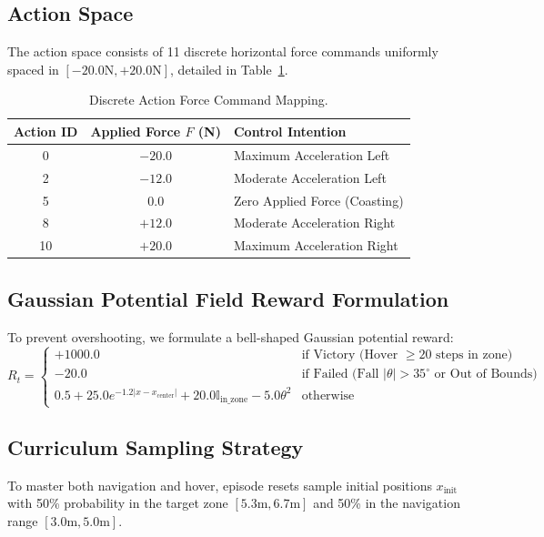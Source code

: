 \documentclass[journal,twocolumn]{IEEEtran}
\begin{document}
\subsection{Action Space}
The action space consists of 11 discrete horizontal force commands uniformly spaced in $[-20.0\text{N}, +20.0\text{N}]$, detailed in Table~\ref{tab:action_space}.

\begin{table}[htbp]
\centering
\caption{Discrete Action Force Command Mapping.}
\label{tab:action_space}
\begin{tabular}{ccl}
\toprule
\textbf{Action ID} & \textbf{Applied Force $F$ (N)} & \textbf{Control Intention} \\ 
\midrule
0 & $-20.0$ & Maximum Acceleration Left \\
2 & $-12.0$ & Moderate Acceleration Left \\
5 & $0.0$    & Zero Applied Force (Coasting) \\
8 & $+12.0$  & Moderate Acceleration Right \\
10 & $+20.0$ & Maximum Acceleration Right \\
\bottomrule
\end{tabular}
\end{table}

\subsection{Gaussian Potential Field Reward Formulation}
To prevent overshooting, we formulate a bell-shaped Gaussian potential reward:
\begin{equation}
R_t = \begin{cases} 
+1000.0 & \text{if Victory (Hover } \ge 20 \text{ steps in zone)} \\
-20.0 & \text{if Failed (Fall } |\theta| > 35^\circ \text{ or Out of Bounds)} \\
0.5 + 25.0 e^{-1.2 |x - x_{\text{center}}|} + 20.0 \mathbb{I}_{\text{in\_zone}} - 5.0 \theta^2 & \text{otherwise}
\end{cases}
\end{equation}

\subsection{Curriculum Sampling Strategy}
To master both navigation and hover, episode resets sample initial positions $x_{\text{init}}$ with 50\% probability in the target zone $[5.3\text{m}, 6.7\text{m}]$ and 50\% in the navigation range $[3.0\text{m}, 5.0\text{m}]$.
\end{document}
